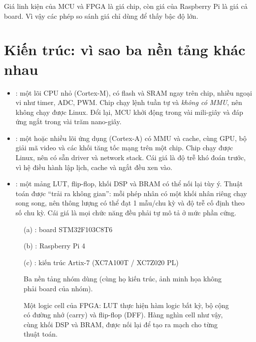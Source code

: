 \documentclass[11pt,a4paper]{article}
\begin{document}
Giá linh kiện của MCU và FPGA là giá chip, còn giá của Raspberry Pi là giá cả board. Vì vậy các phép so sánh giá chỉ dùng để thấy bậc độ lớn.

\section{Kiến trúc: vì sao ba nền tảng khác nhau}

\begin{itemize}
\item \MCU{}: một lõi CPU nhỏ (Cortex-M), có flash và SRAM ngay trên chip, nhiều ngoại vi như timer, ADC, PWM. Chip chạy lệnh tuần tự và \emph{không có MMU}, nên không chạy được Linux. Đổi lại, MCU khởi động trong vài mili-giây và đáp ứng ngắt trong vài trăm nano-giây.
\item \SoC{}: một hoặc nhiều lõi ứng dụng (Cortex-A) có MMU và cache, cùng GPU, bộ giải mã video và các khối tăng tốc mạng trên một chip. Chip chạy được Linux, nên có sẵn driver và network stack. Cái giá là độ trễ khó đoán trước, vì hệ điều hành lập lịch, cache và ngắt đều xen vào.
\item \FPGA{}: một mảng LUT, flip-flop, khối DSP và BRAM có thể nối lại tùy ý. Thuật toán được ``trải ra không gian'': mỗi phép nhân có một khối nhân riêng chạy song song, nên thông lượng có thể đạt 1 mẫu/chu kỳ và độ trễ cố định theo số chu kỳ. Cái giá là mọi chức năng đều phải tự mô tả ở mức phần cứng.
\end{itemize}

\begin{figure}[htbp]
\centering
\begin{minipage}[b]{0.31\linewidth}\centering
  \small (a) \MCU: board STM32F103C8T6
\end{minipage}\hfill
\begin{minipage}[b]{0.31\linewidth}\centering
  \small (b) \SoC: Raspberry Pi 4
\end{minipage}\hfill
\begin{minipage}[b]{0.31\linewidth}\centering
  \small (c) \FPGA: kiến trúc Artix-7 (XC7A100T / XC7Z020 PL)
\end{minipage}
\caption{Ba nền tảng nhóm dùng (cùng họ kiến trúc, ảnh minh họa không phải board của nhóm).}
\end{figure}

\begin{figure}[htbp]
\centering
\begin{minipage}{0.6\linewidth}\centering
\end{minipage}
\caption{Một logic cell của FPGA: LUT thực hiện hàm logic bất kỳ, bộ cộng có đường nhớ (carry) và flip-flop (DFF). Hàng nghìn cell như vậy, cùng khối DSP và BRAM, được nối lại để tạo ra mạch cho từng thuật toán.}
\end{figure}
\end{document}
